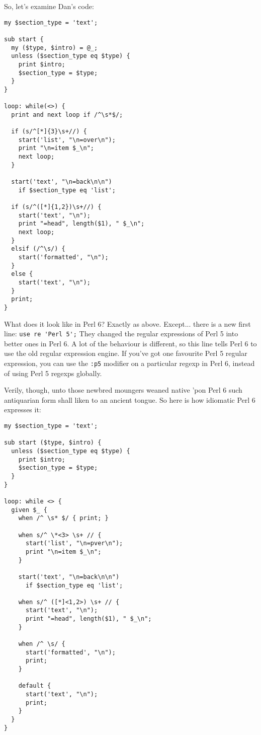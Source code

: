 \documentclass{article}
\newenvironment{example}
  {\addtolength{\linewidth}{-\parindent}%
   \null\begin{minipage}{\linewidth}}
  {\end{minipage}\addtolength{\linewidth}{\parindent}\null}
\begin{document}
\begin{example}
So, let's examine Dan's code:
\begin{verbatim}
my $section_type = 'text';

sub start {
  my ($type, $intro) = @_;
  unless ($section_type eq $type) {
    print $intro;
    $section_type = $type;
  }
}

loop: while(<>) {
  print and next loop if /^\s*$/;

  if (s/^[*]{3}\s+//) {
    start('list', "\n=over\n");
    print "\n=item $_\n";
    next loop;
  }
  
  start('text', "\n=back\n\n")
    if $section_type eq 'list';

  if (s/^([*]{1,2})\s+//) {
    start('text', "\n");
    print "=head", length($1), " $_\n";
    next loop;
  }
  elsif (/^\s/) {
    start('formatted', "\n");
  }
  else {
    start('text', "\n");
  }
  print;
}

\end{verbatim}
\end{example}

What does it look like in Perl 6?  Exactly as above.  Except... there is
a new first line: \verb"use re 'Perl 5';"  They changed the regular
expressions of Perl 5 into better ones in Perl 6.  A lot of the
behaviour is different, so this line tells Perl 6 to use the old regular
expression engine.  If you've got one favourite Perl 5 regular
expression, you can use the \verb':p5' modifier on a particular regexp
in Perl 6, instead of using Perl 5 regexps globally.

\let\rmdefaultold\rmdefault
\renewcommand{\rmdefault}{pzc}
\textrm{Verily, though, unto those newbred moungers weaned native 'pon Perl 6
such antiquarian form shall liken to an ancient tongue.}
\let\rmdefault\rmdefaultold
\let\rmdefaultold\relax
So here is how
idiomatic Perl 6 expresses it:

\begin{example}
\begin{verbatim}
my $section_type = 'text';

sub start ($type, $intro) {
  unless ($section_type eq $type) {
    print $intro;
    $section_type = $type;
  }
}

loop: while <> {
  given $_ {
    when /^ \s* $/ { print; }

    when s/^ \*<3> \s+ // {
      start('list', "\n=pver\n");
      print "\n=item $_\n";
    }

    start('text', "\n=back\n\n")
      if $section_type eq 'list';

    when s/^ ([*]<1,2>) \s+ // {
      start('text', "\n");
      print "=head", length($1), " $_\n";
    }

    when /^ \s/ {
      start('formatted', "\n");
      print;
    }

    default {
      start('text', "\n");
      print;
    }
  }
}

\end{verbatim}
\end{example}
\end{document}

